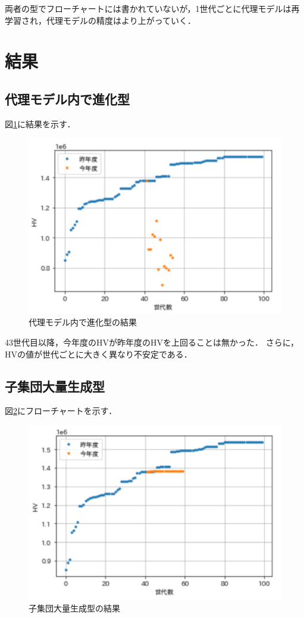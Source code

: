 \documentclass[main]{subfiles}
\begin{document}
        両者の型でフローチャートには書かれていないが，1世代ごとに代理モデルは再学習され，代理モデルの精度はより上がっていく．

    \section{結果}
        \subsection{代理モデル内で進化型}
        図\ref{d_result}に結果を示す．
        \begin{figure}
            \centering
            \includegraphics[width=\linewidth]{figures/d_result.png}
            \caption{代理モデル内で進化型の結果}
            \label{d_result}
        \end{figure}

        43世代目以降，今年度のHVが昨年度のHVを上回ることは無かった．
        さらに，HVの値が世代ごとに大きく異なり不安定である．
        \subsection{子集団大量生成型}
        図\ref{k_result}にフローチャートを示す．
        \begin{figure}
            \centering
            \includegraphics[width=\linewidth]{figures/k_result.png}
            \caption{子集団大量生成型の結果}
            \label{k_result}
        \end{figure}
\end{document}
